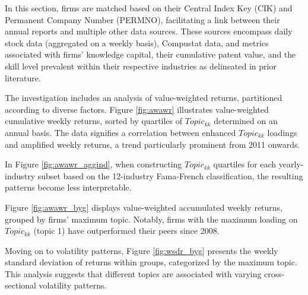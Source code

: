 \documentclass[12pt, letterpaper]{article}
\begin{document}

In this section, firms are matched based on their Central Index Key (CIK) and Permanent Company Number (PERMNO), facilitating a link between their annual reports and multiple other data sources. These sources encompass daily stock data (aggregated on a weekly basis), Compustat data, and metrics associated with firms' knowledge capital, their cumulative patent value, and the skill level prevalent within their respective industries as delineated in prior literature.

The investigation includes an analysis of value-weighted returns, partitioned according to diverse factors. Figure \ref{fig:awawr} illustrates value-weighted cumulative weekly returns, sorted by quartiles of $Topic_{kk}$ determined on an annual basis. The data signifies a correlation between enhanced $Topic_{kk}$ loadings and amplified weekly returns, a trend particularly prominent from 2011 onwards.


In Figure \ref{fig:awawr_aggind}, when constructing $Topic_{kk}$ quartiles for each yearly-industry subset based on the 12-industry Fama-French classification, the resulting patterns become less interpretable.


Figure \ref{fig:awawr_byg} displays value-weighted accumulated weekly returns, grouped by firms' maximum topic. Notably, firms with the maximum loading on $Topic_{kk}$ (topic 1) have outperformed their peers since 2008.


Moving on to volatility patterns, Figure \ref{fig:wsdr_byg} presents the weekly standard deviation of returns within groups, categorized by the maximum topic. This analysis suggests that different topics are associated with varying cross-sectional volatility patterns.

\end{document}
